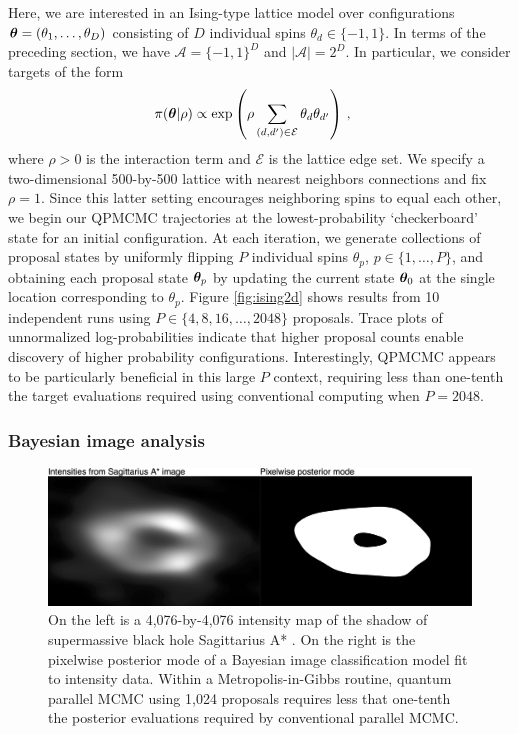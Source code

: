 \documentclass[12pt]{article} %
\begin{document}
Here, we are interested in an Ising-type lattice model over configurations $\boldsymbol{\theta}=(\theta_1,\dots,\theta_D)$ consisting of $D$ individual spins $\theta_d \in \{-1,1\}$. In terms of the preceding section, we have $\mathcal{A}=\{-1,1\}^D$ and $|\mathcal{A}|=2^D$. In particular, we consider targets of the form
\begin{align}\label{eq:ising}
	\pi (\boldsymbol{\theta} | \rho) &\propto \exp \left( \rho \sum_{(d,d')\in \mathcal{E}} \theta_d \theta_{d'} \right)  \, ,
\end{align}
where $\rho>0$ is the interaction term and $\mathcal{E}$ is the lattice edge set.  We specify a two-dimensional 500-by-500 lattice with nearest neighbors connections and fix $\rho=1$.  Since this latter setting encourages neighboring spins to equal each other, we begin our QPMCMC trajectories at the lowest-probability `checkerboard' state for an initial configuration.  At each iteration, we generate collections of proposal states by uniformly flipping $P$ individual spins $\theta_p$, $p \in \{1,\dots,P\}$, and obtaining each proposal state $\boldsymbol{\theta}_p$ by updating the current state $\boldsymbol{\theta}_0$ at the single location corresponding to $\theta_p$. Figure \ref{fig:ising2d} shows results from 10 independent runs using $P\in \{4, 8, 16, \dots, 2048\}$ proposals.  Trace plots of unnormalized log-probabilities indicate that higher proposal counts enable discovery of higher probability configurations.  Interestingly, QPMCMC appears to be particularly beneficial in this large $P$ context, requiring less than one-tenth the target evaluations required using conventional computing when $P=2048$.  

\subsubsection{Bayesian image analysis}\label{sec:bayesIm}

 \begin{figure}[!t]
	\centering
	\includegraphics[width=0.9\linewidth]{blackHole.png}
	\caption{On the left is a 4,076-by-4,076 intensity map of the shadow of supermassive black hole Sagittarius A*  \citep{akiyama2022first}.  On the right is the pixelwise posterior mode of a Bayesian image classification model fit to intensity data.  Within a Metropolis-in-Gibbs routine, quantum parallel MCMC using 1,024 proposals requires less that one-tenth the posterior evaluations required by conventional parallel MCMC.}\label{fig:blackHole}
\end{figure}
\end{document}

